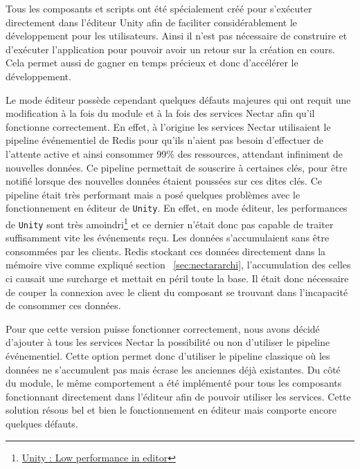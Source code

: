 Tous les composants et scripts ont été spécialement créé pour s'exécuter directement dans l'éditeur Unity afin de faciliter considérablement le développement pour les utilisateurs. Ainsi il n'est pas nécessaire de construire et d'exécuter l'application pour pouvoir avoir un retour sur la création en cours. Cela permet aussi de gagner en temps précieux et donc d'accélérer le développement.

Le mode éditeur possède cependant quelques défauts majeures qui ont requit une modification à la fois du module et à la fois des services Nectar afin qu'il fonctionne correctement. 
En effet, à l'origine les services Nectar utilisaient le pipeline événementiel de Redis pour qu'ils n'aient pas besoin d'effectuer de l'attente active et ainsi consommer 99\% des ressources, attendant infiniment de nouvelles données. Ce pipeline permettait de souscrire à certaines clés, pour être notifié lorsque des nouvelles données étaient poussées sur ces dites clés. Ce pipeline était très performant mais a posé quelques problèmes avec le fonctionnement en éditeur de \texttt{Unity}. En effet, en mode éditeur, les performances de \texttt{Unity} sont très amoindri\footnote{\href{https://forum.unity.com/threads/low-performance-in-editor-but-working-fine-in-build.489030/}{Unity : Low performance in editor}} et ce dernier n'était donc pas capable de traiter suffisamment vite les événements reçu. Les données s'accumulaient sans être consommées par les clients. Redis stockant ces données directement dans la mémoire vive comme expliqué section ~\ref{sec:nectararchi}, l'accumulation des celles ci causait une surcharge et mettait en péril toute la base. Il était donc nécessaire de couper la connexion avec le client du composant se trouvant dans l'incapacité de consommer ces données.

Pour que cette version puisse fonctionner correctement, nous avons décidé d'ajouter à tous les services Nectar la possibilité ou non d'utiliser le pipeline événementiel. Cette option permet donc d'utiliser le pipeline classique où les données ne s'accumulent pas mais écrase les anciennes déjà existantes. Du côté du module, le même comportement a été implémenté pour tous les composants fonctionnant directement dans l'éditeur afin de pouvoir utiliser les services. Cette solution résous bel et bien le fonctionnement en éditeur mais comporte encore quelques défauts.

